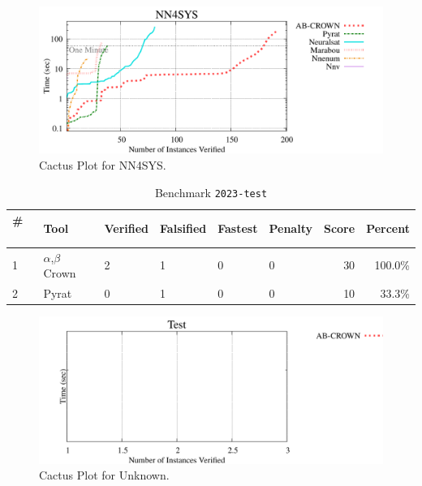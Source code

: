 \begin{figure}[h]
\centerline{\includegraphics[width=\textwidth]{cactus/2023_nn4sys.pdf}}
\caption{Cactus Plot for NN4SYS.}
\label{fig:quantPic}
\end{figure}



\begin{table}[h]
\begin{center}
\caption{Benchmark \texttt{2023-test}} \label{tab:cat_{cat}}
{\setlength{\tabcolsep}{2pt}
\begin{tabular}[h]{@{}llllllrr@{}}
\toprule
\textbf{\# ~} & \textbf{Tool} & \textbf{Verified} & \textbf{Falsified} & \textbf{Fastest} & \textbf{Penalty} & \textbf{Score} & \textbf{Percent}\\
\midrule
1 & $\alpha$,$\beta$ Crown & 2 & 1 & 0 & 0 & 30 & 100.0\% \\
2 & Pyrat & 0 & 1 & 0 & 0 & 10 & 33.3\% \\
\bottomrule
\end{tabular}
}
\end{center}
\end{table}



\begin{figure}[h]
\centerline{\includegraphics[width=\textwidth]{cactus/2023_test.pdf}}
\caption{Cactus Plot for Unknown.}
\label{fig:quantPic}
\end{figure}


